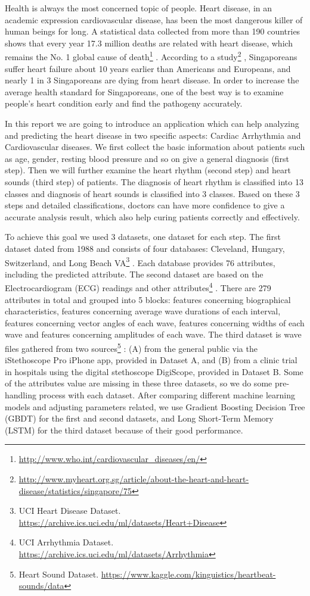 \documentclass[letterpaper]{article} %
\begin{document}
Health is always the most concerned topic of people. Heart disease, in an academic expression cardiovascular disease, has been the most dangerous killer of human beings for long. A statistical data collected from more than 190 countries shows that every year 17.3 million deaths are related with heart disease, which remains the No. 1 global cause of death\footnote{\url{http://www.who.int/cardiovascular_diseases/en/}} \cite{WHO2016}. According to a study\footnote{\url{http://www.myheart.org.sg/article/about-the-heart-and-heart-disease/statistics/singapore/75}} \cite{singapore2016}, Singaporeans suffer heart failure about 10 years earlier than Americans and Europeans, and nearly 1 in 3 Singaporeans are dying from heart disease. In order to increase the average health standard for Singaporeans, one of the best way is to examine people's heart condition early and find the pathogeny accurately.

In this report we are going to introduce an application which can help analyzing and predicting the heart disease in two specific aspects: Cardiac Arrhythmia and Cardiovascular diseases. We first collect the basic information about patients such as age, gender, resting blood pressure and so on give a general diagnosis (first step). Then we will further examine the heart rhythm (second step) and heart sounds (third step) of patients. The diagnosis of heart rhythm is classified into 13 classes and diagnosis of heart sounds is classified into 3 classes. Based on these 3 steps and detailed classifications, doctors can have more confidence to give a accurate analysis result, which also help curing patients correctly and effectively.
 
To achieve this goal we used 3 datasets, one dataset for each step. The first dataset dated from 1988 and consists of four databases: Cleveland, Hungary, Switzerland, and Long Beach VA\footnote{UCI Heart Disease Dataset. \url{https://archive.ics.uci.edu/ml/datasets/Heart+Disease}} \cite{1988heart}. Each database provides 76 attributes, including the predicted attribute. The second dataset are based on the Electrocardiogram (ECG) readings and other attributes\footnote{UCI Arrhythmia Dataset. \url{https://archive.ics.uci.edu/ml/datasets/Arrhythmia}} \cite{guvenir1998arrhythmia}. There are 279 attributes in total and grouped into 5 blocks: features concerning biographical characteristics, features concerning average wave durations of each interval, features concerning vector angles of each wave, features concerning widths of each wave and features concerning amplitudes of each wave. The third dataset is wave files gathered from two sources\footnote{Heart Sound Dataset. \url{https://www.kaggle.com/kinguistics/heartbeat-sounds/data}} \cite{king2017heart}: (A) from the general public via the iStethoscope Pro iPhone app, provided in Dataset A, and (B) from a clinic trial in hospitals using the digital stethoscope DigiScope, provided in Dataset B. Some of the attributes value are missing in these three datasets, so we do some pre-handling process with each dataset. After comparing different machine learning models and adjusting parameters related, we use Gradient Boosting Decision Tree (GBDT) for the first and second datasets, and Long Short-Term Memory (LSTM) for the third dataset because of their good performance.
\end{document}

